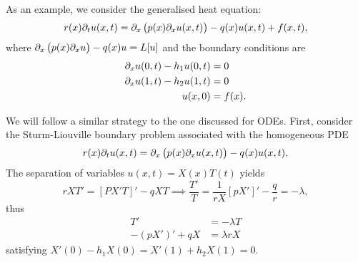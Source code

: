 \begin{eg}
	As an example, we consider the generalised heat equation:
	\[
		r(x) \partial_t u(x,t) = \partial_x\left(p(x) \partial_x u(x,t)\right) - q(x) u(x,t) + f(x,t),
	\]
	where $\partial_x\left(p(x) \partial_x u\right) - q(x) u = L[u]$ and the boundary conditions are
	\begin{align*}
		\partial_x u(0,t) - h_1 u(0,t) &= 0 \\
		\partial_x u(1,t) - h_2 u(1,t) &= 0 \\
		u(x,0) &= f(x).
	\end{align*}
	
	We will follow a similar strategy to the one discussed for ODEs. First, consider the Sturm-Liouville boundary problem associated with the homogeneous PDE
	\[
		r(x) \partial_t u(x,t) = \partial_x\left(p(x) \partial_x u(x,t)\right) - q(x) u(x,t).
	\]
	The separation of variables $u(x,t) = X(x)T(t)$ yields
	\[
		rXT' = [PX'T]' - qXT \implies \frac{T'}{T} = \frac{1}{rX}[pX']' - \frac{q}{r} = -\lambda,
	\]
	thus
	\begin{align*}
		T' &= -\lambda T \\
		-(pX')' + qX &= \lambda rX
	\end{align*}
	satisfying $X'(0) - h_1X(0) = X'(1) + h_2X(1) = 0$.
	

\end{eg}
